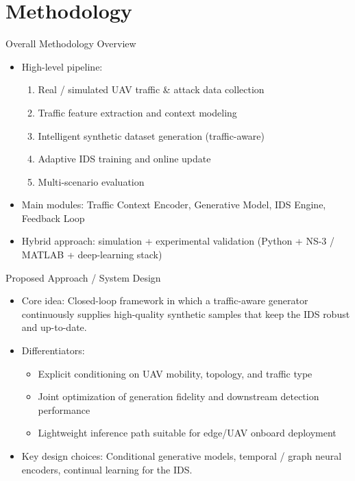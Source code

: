 \documentclass[10pt]{beamer}
\begin{document}
\section{Methodology}
\begin{frame}{Overall Methodology Overview}
    \begin{itemize}
        \item High-level pipeline:
        \begin{enumerate}
            \item Real / simulated UAV traffic \& attack data collection
            \item Traffic feature extraction and context modeling
            \item Intelligent synthetic dataset generation (traffic-aware)
            \item Adaptive IDS training and online update
            \item Multi-scenario evaluation
        \end{enumerate}
        \item Main modules: Traffic Context Encoder, Generative Model, IDS Engine, Feedback Loop
        \item Hybrid approach: simulation + experimental validation (Python + NS-3 / MATLAB + deep-learning stack)
    \end{itemize}
\end{frame}

\begin{frame}{Proposed Approach / System Design}
    \begin{itemize}
        \item Core idea: Closed-loop framework in which a traffic-aware generator continuously supplies high-quality synthetic samples that keep the IDS robust and up-to-date.
        \item Differentiators:
        \begin{itemize}
            \item Explicit conditioning on UAV mobility, topology, and traffic type
            \item Joint optimization of generation fidelity and downstream detection performance
            \item Lightweight inference path suitable for edge/UAV onboard deployment
        \end{itemize}
        \item Key design choices: Conditional generative models, temporal / graph neural encoders, continual learning for the IDS.
    \end{itemize}
\end{frame}
\end{document}
